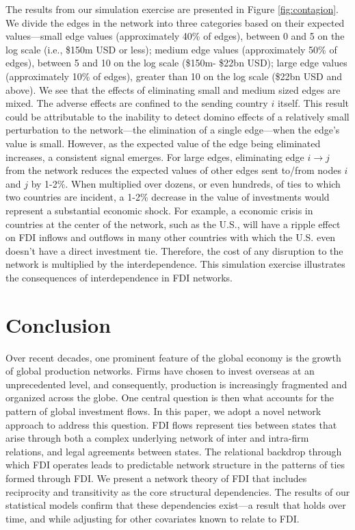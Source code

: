 \documentclass[reqno,onecolumn,letterpaper,12pt]{article}
\begin{document}
The results from our simulation exercise are presented in Figure \ref{fig:contagion}. We divide the edges in the network into three categories based on their expected values---small edge values (approximately 40\% of edges), between 0 and 5 on the log scale (i.e., \$150m USD or less); medium edge values (approximately 50\% of edges), between 5 and 10 on the log scale (\$150m- \$22bn USD); large edge values (approximately 10\% of edges), greater than 10 on the log scale (\$22bn USD and above). We see that the effects of eliminating small and medium sized edges are mixed. The adverse effects are confined to the sending country $i$ itself. This result could be attributable to the inability to detect domino effects of a relatively small perturbation to the network---the elimination of a single edge---when the edge's value is small. However, as the expected value of the edge being eliminated increases, a consistent signal emerges. For large edges, eliminating edge $i \rightarrow j$ from the network reduces the expected values of other edges sent to/from nodes $i$ and $j$ by 1-2\%. When multiplied over dozens, or even hundreds, of ties to which two countries are incident, a 1-2\% decrease in the value of investments would represent a substantial economic shock. For example, a economic crisis in countries at the center of the network, such as the U.S., will have a ripple effect on FDI inflows and outflows in many other countries with which the U.S. even doesn't have a direct investment tie. Therefore, the cost of any disruption to the network is multiplied by the interdependence. This simulation exercise illustrates the consequences of interdependence in FDI networks.









\section{Conclusion}

Over recent decades, one prominent feature of the global economy is the growth of global production networks. Firms have chosen to invest overseas at an unprecedented level, and consequently, production is increasingly fragmented and organized across the globe. One central question is then what accounts for the pattern of global investment flows. In this paper, we adopt a novel network approach to address this question. FDI flows represent ties between states that arise through both a complex underlying network of inter and intra-firm relations, and legal agreements between states. The relational backdrop through which FDI operates leads to predictable network structure in the patterns of ties formed through FDI. We present a network theory of FDI that includes reciprocity and transitivity as the core structural dependencies. The results of our statistical models confirm that these dependencies exist---a result that holds over time, and while adjusting for other covariates known to relate to FDI.
\end{document}
